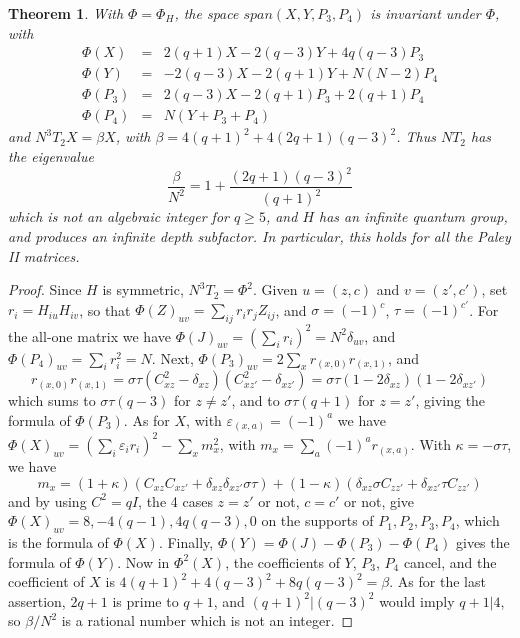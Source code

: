 \documentclass[11pt]{amsart}
\newtheorem{theorem}{Theorem}[section]
\begin{document}
\begin{theorem}\label{thm:conference}
With $\Phi=\Phi_H$, the space $span(X,Y,P_3,P_4)$ is invariant under $\Phi$, with
\begin{eqnarray*}
\Phi(X)&=&2(q+1)X-2(q-3)Y+4q(q-3)P_3\\
\Phi(Y)&=&-2(q-3)X-2(q+1)Y+N(N-2)P_4\\
\Phi(P_3)&=&2(q-3)X-2(q+1)P_3+2(q+1)P_4\\
\Phi(P_4)&=&N(Y+P_3+P_4)
\end{eqnarray*}
and $N^3T_2X=\beta X$, with $\beta=4(q+1)^2+4(2q+1)(q-3)^2$. Thus $NT_2$ has the eigenvalue
$$\frac{\beta}{N^2}=1+\frac{(2q+1)(q-3)^2}{(q+1)^2}$$
which is not an algebraic integer for $q\geq5$, and $H$ has an infinite quantum group, and produces an infinite depth subfactor. In particular, this holds for all the Paley II matrices.
\end{theorem}

\begin{proof}
Since $H$ is symmetric, $N^3T_2=\Phi^2$. Given $u=(z,c)$ and $v=(z',c')$, set $r_i=H_{iu}H_{iv}$, so that $\Phi(Z)_{uv}=\sum_{ij}r_ir_jZ_{ij}$, and $\sigma=(-1)^c$, $\tau=(-1)^{c'}$. For the all-one matrix we have $\Phi(J)_{uv}=(\sum_ir_i)^2=N^2\delta_{uv}$, and $\Phi(P_4)_{uv}=\sum_ir_i^2=N$. Next, $\Phi(P_3)_{uv}=2\sum_xr_{(x,0)}r_{(x,1)}$, and
$$r_{(x,0)}r_{(x,1)}=\sigma\tau(C_{xz}^2-\delta_{xz})(C_{xz'}^2-\delta_{xz'})=\sigma\tau(1-2\delta_{xz})(1-2\delta_{xz'})$$
which sums to $\sigma\tau(q-3)$ for $z\neq z'$, and to $\sigma\tau(q+1)$ for $z=z'$, giving the formula of $\Phi(P_3)$. As for $X$, with $\varepsilon_{(x,a)}=(-1)^a$ we have $\Phi(X)_{uv}=(\sum_i\varepsilon_ir_i)^2-\sum_xm_x^2$, with $m_x=\sum_a(-1)^ar_{(x,a)}$. With $\kappa=-\sigma\tau$, we have
$$m_x=(1+\kappa)\left(C_{xz}C_{xz'}+\delta_{xz}\delta_{xz'}\sigma\tau\right)+(1-\kappa)\left(\delta_{xz}\sigma C_{zz'}+\delta_{xz'}\tau C_{zz'}\right)$$
and by using $C^2=qI$, the 4 cases $z=z'$ or not, $c=c'$ or not, give $\Phi(X)_{uv}=8,-4(q-1),4q(q-3),0$ on the supports of $P_1,P_2,P_3,P_4$, which is the formula of $\Phi(X)$. Finally, $\Phi(Y)=\Phi(J)-\Phi(P_3)-\Phi(P_4)$ gives the formula of $\Phi(Y)$. Now in $\Phi^2(X)$, the coefficients of $Y$, $P_3$, $P_4$ cancel, and the coefficient of $X$ is $4(q+1)^2+4(q-3)^2+8q(q-3)^2=\beta$. As for the last assertion, $2q+1$ is prime to $q+1$, and $(q+1)^2|(q-3)^2$ would imply $q+1|4$, so $\beta/N^2$ is a rational number which is not an integer.
\end{proof}
\end{document}
